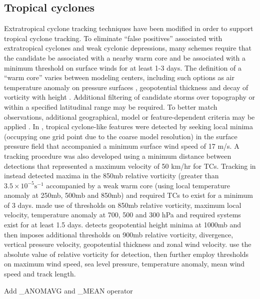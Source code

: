 \documentclass[gmdd, hvmath, online]{copernicus_discussions}
\begin{document}
\subsection{Tropical cyclones}

Extratropical cyclone tracking techniques have been modified in order to support tropical cyclone tracking.  To eliminate ``false positives'' associated with extratropical cyclones and weak cyclonic depressions, many schemes require that the candidate be associated with a nearby warm core and be associated with a minimum threshold on surface winds for at least 1-3 days.  The definition of a ``warm core'' varies between modeling centers, including such options as air temperature anomaly on pressure surfaces \citep{Vitart1997,Zhao2009,Murakami2012}, geopotential thickness \citep{tsutsui1996simulated} and decay of vorticity with height \citep{Bengtsson2007,Strachan2013}.  Additional filtering of candidate storms over topography or within a specified latitudinal range may be required.  To better match observations, additional geographical, model or feature-dependent criteria may be applied \citep{camargo2002improving,Walsh2007,Murakami2010,Murakami2012}.  In \cite{broccoli1990existing}, tropical cyclone-like features were detected by seeking local minima (occupying one grid point due to the coarse model resolution) in the surface pressure field that accompanied a minimum surface wind speed of 17 m/s.  A tracking procedure was also developed using a minimum distance between detections that represented a maximum velocity of 50 km/hr for TCs.  Tracking in \cite{haarsma1993tropical} instead detected maxima in the 850mb relative vorticity (greater than $3.5 \times 10^{-5} \mbox{s}^{-1}$ accompanied by a weak warm core (using local temperature anomaly at 250mb, 500mb and 850mb) and required TCs to exist for a minimum of 3 days.  \cite{bengtsson1995hurricane} made use of thresholds on 850mb relative vorticity, maximum local velocity, temperature anomaly at 700, 500 and 300 hPa and required systems exist for at least 1.5 days.  \cite{tsutsui1996simulated} detects geopotential height minima at 1000mb and then imposes additional thresholds on 900mb relative vorticity, divergence, vertical pressure velocity, geopotential thickness and zonal wind velocity.  \cite{camargo2002improving} use the absolute value of relative vorticity for detection, then further employ thresholds on maximum wind speed, sea level pressure, temperature anomaly, mean wind speed and track length.

{\color{red}Add \_ANOMAVG and \_MEAN operator}
\end{document}
